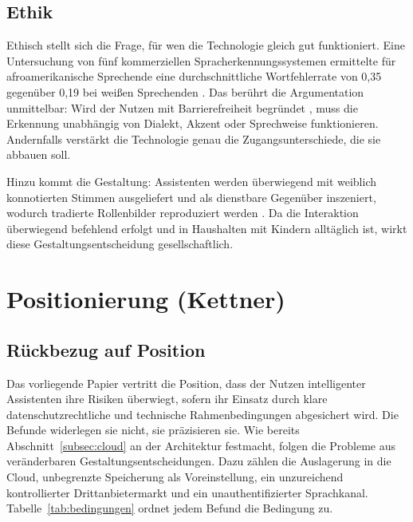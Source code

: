 \subsection{Ethik}

Ethisch stellt sich die Frage, für wen die Technologie gleich gut funktioniert. Eine Untersuchung von fünf kommerziellen Spracherkennungssystemen ermittelte für afroamerikanische Sprechende eine durchschnittliche Wortfehlerrate von 0,35 gegenüber 0,19 bei weißen Sprechenden \cite{koenecke2020racial}. Das berührt die Argumentation unmittelbar: Wird der Nutzen mit Barrierefreiheit begründet \cite{Esquivel2024}, muss die Erkennung unabhängig von Dialekt, Akzent oder Sprechweise funktionieren. Andernfalls verstärkt die Technologie genau die Zugangsunterschiede, die sie abbauen soll.

Hinzu kommt die Gestaltung: Assistenten werden überwiegend mit weiblich konnotierten Stimmen ausgeliefert und als dienstbare Gegenüber inszeniert, wodurch tradierte Rollenbilder reproduziert werden \cite{sindoni2024feminization}. Da die Interaktion überwiegend befehlend erfolgt und in Haushalten mit Kindern alltäglich ist, wirkt diese Gestaltungsentscheidung gesellschaftlich.

\section{Positionierung (Kettner)}
\label{sec:positionierung}

\subsection{Rückbezug auf Position}

Das vorliegende Papier vertritt die Position, dass der Nutzen intelligenter Assistenten ihre Risiken überwiegt, sofern ihr Einsatz durch klare datenschutzrechtliche und technische Rahmenbedingungen abgesichert wird. Die Befunde widerlegen sie nicht, sie präzisieren sie. Wie bereits Abschnitt~\ref{subsec:cloud} an der Architektur festmacht, folgen die Probleme aus veränderbaren Gestaltungsentscheidungen. Dazu zählen die Auslagerung in die Cloud, unbegrenzte Speicherung als Voreinstellung, ein unzureichend kontrollierter Drittanbietermarkt und ein unauthentifizierter Sprachkanal. Tabelle~\ref{tab:bedingungen} ordnet jedem Befund die Bedingung zu.

